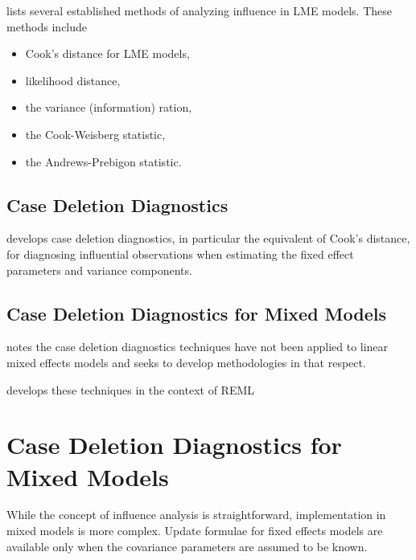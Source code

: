 \documentclass[12pt, a4paper]{report}
\theoremstyle{plain}
\theoremstyle{definition}
\theoremstyle{remark}
\begin{document}
	
	\citet{Zewotir} lists several established methods of analyzing influence in LME models. These methods include \begin{itemize}
		\item Cook's distance for LME models,
		\item {} likelihood distance,
		\item the variance (information) ration,
		\item the  Cook-Weisberg statistic,
		\item the  Andrews-Prebigon statistic.
	\end{itemize}
	
	
	
	
	\subsection{Case Deletion Diagnostics} %
	
	\citet{CPJ} develops  case deletion diagnostics, in particular the equivalent of  Cook's distance, for diagnosing influential observations when estimating the fixed effect parameters and variance components.
	
	
	
	\subsection{Case Deletion Diagnostics for Mixed Models}
	
	\citet{Christiansen} notes the case deletion diagnostics techniques have not been applied to linear mixed effects models and seeks to develop methodologies in that respect.
	
	\citet{Christiansen} develops these techniques in the context of REML
	
	
	
	
	
	
	
	
	
	
	\section{Case Deletion Diagnostics for Mixed Models}
	While the concept of influence analysis is straightforward,
	implementation in mixed models is more complex. Update formulae
	for fixed effects models are available only when the covariance
	parameters are assumed to be known.
	
\end{document}
